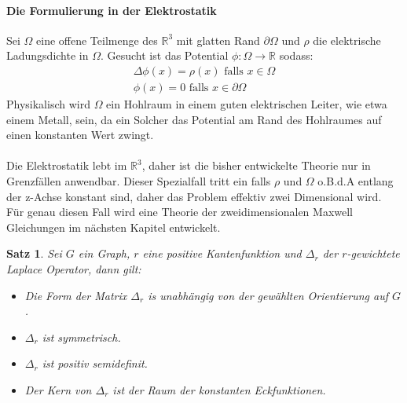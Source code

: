 \documentclass[11pt,a4paper,leqno]{report}
\newtheorem{proposition}{Satz}[chapter]
\numberwithin{equation}{chapter}
\begin{document}
\paragraph{Die Formulierung in der Elektrostatik} Sei $\Omega$ eine offene Teilmenge des $\mathbb{R}^3$ mit glatten Rand $\partial\Omega$ und $\rho$ die elektrische Ladungsdichte in $\Omega$. Gesucht ist das Potential $\phi:\Omega\rightarrow\mathbb{R}$ sodass:
\begin{align}
\Delta \phi(x) = \rho(x)\text{  falls } x\in \Omega\\
\phi(x) = 0\text{  falls } x\in \partial\Omega
\end{align}
Physikalisch wird $\Omega$ ein Hohlraum in einem guten elektrischen Leiter, wie etwa einem Metall, sein,  da ein Solcher das Potential am Rand des Hohlraumes auf einen konstanten Wert zwingt.\\
\\
Die Elektrostatik lebt im $\mathbb{R}^3$, daher ist die bisher entwickelte Theorie nur in Grenzf\"allen anwendbar. Dieser Spezialfall tritt ein falls $\rho$ und $\Omega$ o.B.d.A entlang der z-Achse konstant sind, daher das Problem effektiv zwei Dimensional wird. F\"ur genau diesen Fall wird eine Theorie der zweidimensionalen Maxwell Gleichungen im n\"achsten Kapitel entwickelt. 
\begin{proposition}
	Sei $G$ ein  Graph, $r$ eine positive Kantenfunktion und $\Delta_r$ der $r$-gewichtete Laplace Operator, dann gilt:
	\begin{itemize}
		\item Die Form der Matrix $\Delta_r$ is unabh\"angig von der gew\"ahlten Orientierung auf $G$. 
		\item $\Delta_r$ ist symmetrisch.\\
		\item $\Delta_r$ ist positiv semidefinit.\\
		\item Der Kern von $\Delta_r$ ist der Raum der konstanten Eckfunktionen.
	\end{itemize}
\end{proposition}
\end{document}
